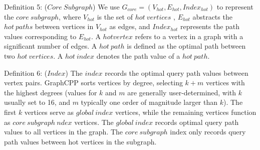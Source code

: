 \documentclass[lettersize,journal]{IEEEtran} %
\begin{document}
Definition 5: ($Core~Subgraph$) We use $G_{core}=(V_{hot},E_{hot},Index_{hot})$ to represent the $core~subgraph$, where $V_{hot}$ is the set of $hot~vertices$ , $E_{hot}$ abstracts the $hot~paths$ between vertices in $V_{hot}$ as edges, and $Index_{hot}$ represents the path values corresponding to $E_{hot}$. A $hot vertex$ refers to a vertex in a graph with a significant number of edges. A $hot~path$ is defined as the optimal path between two $hot~vertices$. A $hot~index$ denotes the path value of a $hot~path$.

Definition 6: ($Index$) The $index$ records the optimal query path values between vertex pairs. GraphCPP sorts vertices by degree, selecting $k+m$ vertices with the highest degrees (values for $k$ and $m$ are generally user-determined, with $k$ usually set to 16, and $m$ typically one order of magnitude larger than $k$). The first $k$ vertices serve as $global~index$ vertices, while the remaining vertices function as $core~subgraph~ndex$ vertices. The $global~index$ records optimal query path values to all vertices in the graph. The $core~subgraph$ index only records query path values between hot vertices in the subgraph.
\end{document}
